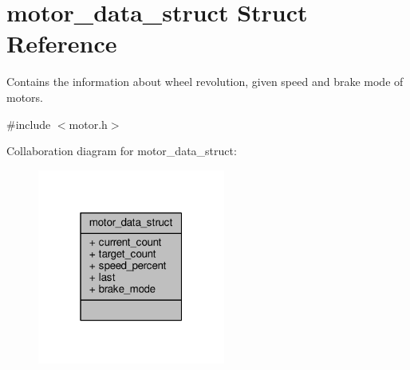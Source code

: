 \hypertarget{structmotor__data__struct}{}\section{motor\+\_\+data\+\_\+struct Struct Reference}
\label{structmotor__data__struct}


Contains the information about wheel revolution, given speed and brake mode of motors.  




{\ttfamily \#include $<$motor.\+h$>$}



Collaboration diagram for motor\+\_\+data\+\_\+struct\+:\nopagebreak
\begin{figure}[H]
\begin{center}
\leavevmode
\includegraphics[width=175pt]{structmotor__data__struct__coll__graph}
\end{center}
\end{figure}
